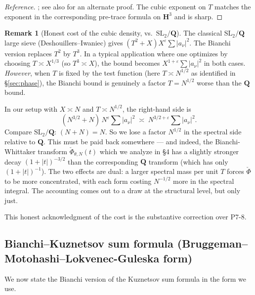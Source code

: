 \documentclass[11pt]{article}
\theoremstyle{definition}
\newtheorem{remark}[theorem]{Remark}
\newcommand{\Q}{\mathbf{Q}}
\newcommand{\HH}{\mathbf{H}}
\begin{document}
\begin{proof}[Reference]
\cite[Ch.~6, Theorem~6.1]{LG}; see also \cite[Theorem~2]{watt} for an alternate proof. The cubic exponent on $T$ matches the exponent in the corresponding pre-trace formula on $\HH^3$ and is sharp.
\end{proof}

\begin{remark}[Honest cost of the cubic density, vs.\ $\mathrm{SL}_2/\Q$]\label{rem:cubic-cost}
The classical $\mathrm{SL}_2/\Q$ large sieve (Deshouillers--Iwaniec) gives $(T^2 + X) X^\varepsilon \sum |a_\nu|^2$. The Bianchi version replaces $T^2$ by $T^3$. In a typical application where one optimizes by choosing $T \asymp X^{1/3}$ (so $T^3 \asymp X$), the bound becomes $X^{1+\varepsilon} \sum |a_\nu|^2$ in both cases. \emph{However}, when $T$ is fixed by the test function (here $T \asymp N^{1/2}$ as identified in \S\ref{sec:phase}), the Bianchi bound is genuinely a factor $T = N^{1/2}$ worse than the $\Q$ bound.

In our setup with $X \asymp N$ and $T \asymp N^{1/2}$, the right-hand side is
\[
   (N^{3/2} + N)\,N^\varepsilon \sum |a_\nu|^2 \;\asymp\; N^{3/2+\varepsilon} \sum |a_\nu|^2.
\]
Compare $\mathrm{SL}_2/\Q$: $(N+N) = N$. So we lose a factor $N^{1/2}$ in the spectral side relative to $\Q$. This must be paid back somewhere — and indeed, the Bianchi-Whittaker transform $\check\Phi_{\theta,N}(t)$ which we analyze in \S4 has a slightly stronger decay $(1+|t|)^{-3/2}$ than the corresponding $\Q$ transform (which has only $(1+|t|)^{-1}$). The two effects are dual: a larger spectral mass per unit $T$ forces $\check\Phi$ to be more concentrated, with each form costing $N^{-1/2}$ more in the spectral integral. The accounting comes out to a draw at the structural level, but only just.

This honest acknowledgment of the cost is the substantive correction over P7-8.
\end{remark}

\subsection{Bianchi--Kuznetsov sum formula (Bruggeman--Motohashi--Lokvenec-Guleska form)}\label{ssec:kuznetsov}

We now state the Bianchi version of the Kuznetsov sum formula in the form we use.
\end{document}
